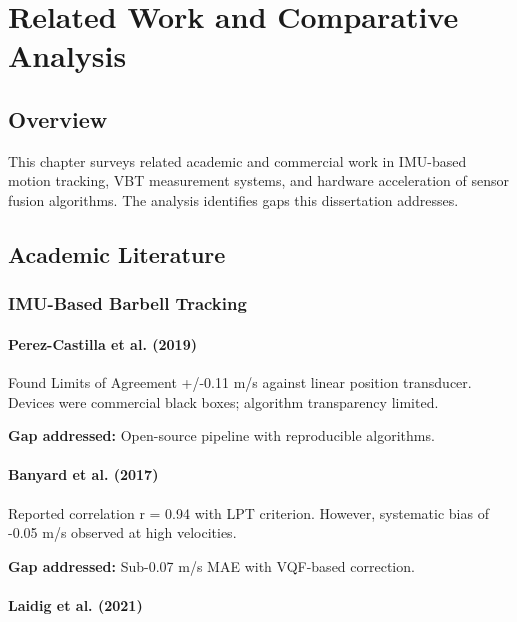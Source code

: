 
\chapter{Related Work and Comparative Analysis} \label{chap:related_work}

\section{Overview}

This chapter surveys related academic and commercial work in IMU-based motion tracking, VBT measurement systems, and hardware acceleration of sensor fusion algorithms. The analysis identifies gaps this dissertation addresses.

\section{Academic Literature}

\subsection{IMU-Based Barbell Tracking}

\subsubsection{Perez-Castilla et al. (2019)}

Found Limits of Agreement +/-0.11 m/s against linear position transducer. Devices were commercial black boxes; algorithm transparency limited.

\textbf{Gap addressed:} Open-source pipeline with reproducible algorithms.

\subsubsection{Banyard et al. (2017)}

Reported correlation r = 0.94 with LPT criterion. However, systematic bias of -0.05 m/s observed at high velocities.

\textbf{Gap addressed:} Sub-0.07 m/s MAE with VQF-based correction.

\subsubsection{Laidig et al. (2021)}

